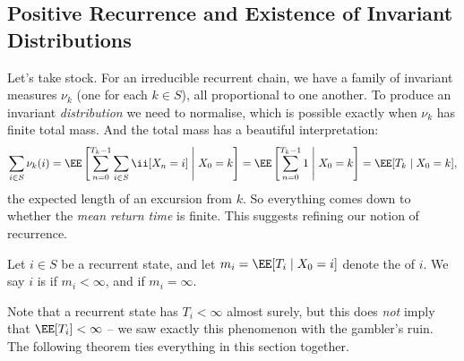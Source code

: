 \documentclass[a4paper]{scrartcl}
\begin{document}
\subsection{Positive Recurrence and Existence of Invariant Distributions}

Let's take stock. For an irreducible recurrent chain, we have a family of invariant measures $\nu_k$ (one for each $k \in S$), all proportional to one another. To produce an invariant \emph{distribution} we need to normalise, which is possible exactly when $\nu_k$ has finite total mass. And the total mass has a beautiful interpretation:
$$
\sum_{i \in S} \nu_k(i) = \EE\left[\sum_{n = 0}^{T_k - 1} \sum_{i \in S}\ii[X_n = i] \;\middle|\; X_0 = k\right] = \EE\left[\sum_{n = 0}^{T_k - 1} 1 \;\middle|\; X_0 = k\right] = \EE[T_k \mid X_0 = k],
$$
the expected length of an excursion from $k$. So everything comes down to whether the \emph{mean return time} is finite. This suggests refining our notion of recurrence.

\begin{definition}
	Let $i \in S$ be a recurrent state, and let $m_i = \EE[T_i \mid X_0 = i]$ denote the  of $i$. We say $i$ is  if $m_i < \infty$, and  if $m_i = \infty$.
\end{definition}

Note that a recurrent state has $T_i < \infty$ almost surely, but this does \emph{not} imply that $\EE[T_i] < \infty$ -- we saw exactly this phenomenon with the gambler's ruin. The following theorem ties everything in this section together.
\end{document}
